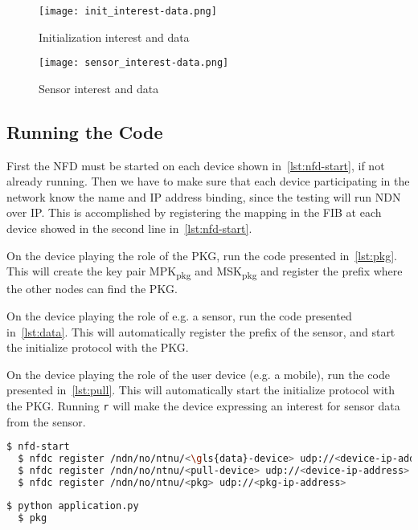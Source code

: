 \begin{figure}[ht]
  \centering
  \texttt{[image: init\_interest-data.png]}
  \caption{Initialization \gls{interest} and \gls{data}}
  \label{fig:init_interest-data}
\end{figure}

\begin{figure}[ht]
  \centering
  \texttt{[image: sensor\_interest-data.png]}
  \caption{Sensor \gls{interest} and \gls{data}}
  \label{fig:sensor_interest-data}
\end{figure}

\subsection{Running the Code}
First the \gls{NFD} must be started on each device shown in~\autoref{lst:nfd-start}, if not already running. 
Then we have to make sure that each device participating in the network know the \gls{name} and \gls{IP} address binding, since the testing will run \gls{NDN} over \gls{IP}.
This is accomplished by registering the mapping in the \gls{FIB} at each device showed in the second line in~\autoref{lst:nfd-start}.

On the device playing the role of the \gls{PKG}, run the code presented in~\autoref{lst:pkg}. 
This will create the key pair MPK\textsubscript{pkg} and MSK\textsubscript{pkg} and register the prefix where the other nodes can find the \gls{PKG}.

On the device playing the role of e.g. a sensor, run the code presented in~\autoref{lst:data}.
This will automatically register the prefix of the sensor, and start the initialize protocol with the \gls{PKG}.

On the device playing the role of the user device (e.g. a mobile), run the code presented in~\autoref{lst:pull}.
This will automatically start the initialize protocol with the \gls{PKG}.
Running \texttt{r} will make the device expressing an \gls{interest} for sensor \gls{data} from the sensor.

\begin{lstlisting}[language=bash, caption={NFD Start}, label={lst:nfd-start}]
  $ nfd-start
  $ nfdc register /ndn/no/ntnu/<\gls{data}-device> udp://<device-ip-address>
  $ nfdc register /ndn/no/ntnu/<pull-device> udp://<device-ip-address>
  $ nfdc register /ndn/no/ntnu/<pkg> udp://<pkg-ip-address>
\end{lstlisting}

\begin{lstlisting}[language=bash, caption={Start PKG}, label={lst:pkg}]
  $ python application.py
  $ pkg
\end{lstlisting}

